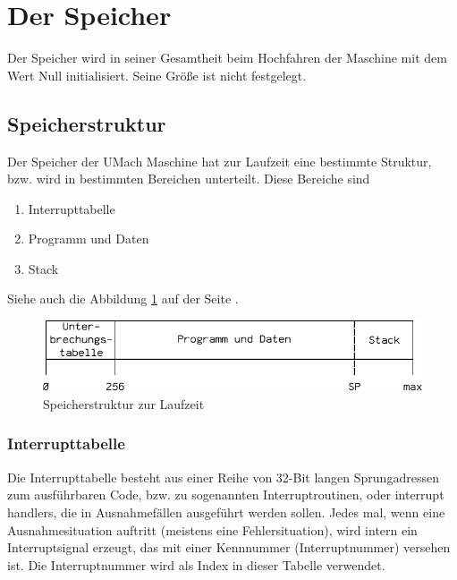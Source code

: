 \section{Der Speicher}
\label{sec:Speicher}

Der Speicher wird in seiner Gesamtheit beim Hochfahren der Maschine mit dem
Wert Null initialisiert. Seine Größe ist nicht festgelegt.



\subsection{Speicherstruktur}
\label{subsec:Speicherstruktur}

Der Speicher der UMach Maschine hat zur Laufzeit eine bestimmte Struktur, bzw.
wird in bestimmten Bereichen unterteilt. Diese Bereiche sind
\begin{enumerate}
 \item Interrupttabelle
 \item Programm und Daten
 \item Stack
\end{enumerate}

Siehe auch die Abbildung \ref{fig:Speicherstruktur} auf der Seite
\pageref{fig:Speicherstruktur}.

\begin{figure}[htp]
 \centering
 \includegraphics{./img/UMach-Speicherstruktur}
 \caption[Speicherstruktur]{Speicherstruktur zur Laufzeit}
 \label{fig:Speicherstruktur}
\end{figure}



\subsubsection{Interrupttabelle}
\label{subsubsec:Interrupttabelle}

Die Interrupttabelle besteht aus einer Reihe von 32-Bit langen Sprungadressen
zum ausführbaren Code, bzw. zu sogenannten Interruptroutinen, oder \glqq
interrupt handlers\grqq, die in Ausnahmefällen ausgeführt werden sollen. Jedes
mal, wenn eine Ausnahmesituation auftritt (meistens eine Fehlersituation), wird
intern ein Interruptsignal erzeugt, das mit einer Kennnummer (Interruptnummer)
versehen ist. Die Interruptnummer wird als Index in dieser Tabelle verwendet.



